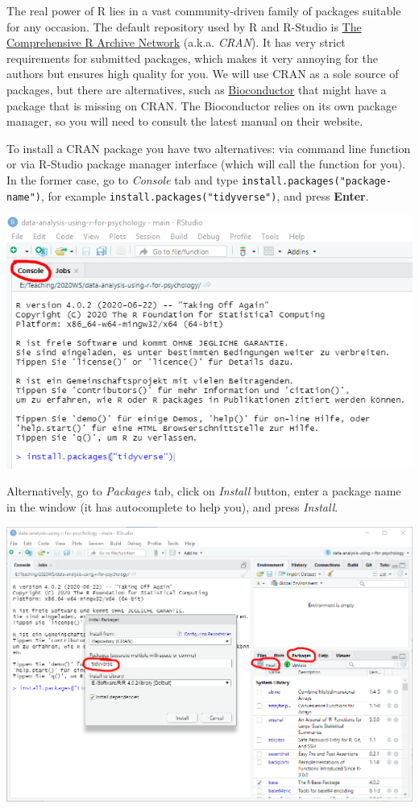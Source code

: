 \documentclass[
]{book}
\begin{document}
The real power of R lies in a vast community-driven family of packages suitable for any occasion. The default repository used by R and R-Studio is \href{https://cran.r-project.org/}{The Comprehensive R Archive Network} (a.k.a. \emph{CRAN}). It has very strict requirements for submitted packages, which makes it very annoying for the authors but ensures high quality for you. We will use CRAN as a sole source of packages, but there are alternatives, such as \href{http://www.bioconductor.org/}{Bioconductor} that might have a package that is missing on CRAN. The Bioconductor relies on its own package manager, so you will need to consult the latest manual on their website.

To install a CRAN package you have two alternatives: via command line function or via R-Studio package manager interface (which will call the function for you). In the former case, go to \emph{Console} tab and type \texttt{install.packages("package-name")}, for example \texttt{install.packages("tidyverse")}, and press \textbf{Enter}.

\begin{center}\includegraphics[width=1\linewidth]{images/install-packages-cmd} \end{center}

Alternatively, go to \emph{Packages} tab, click on \emph{Install} button, enter a package name in the window (it has autocomplete to help you), and press \emph{Install}.

\begin{center}\includegraphics[width=1\linewidth]{images/install-packages-gui} \end{center}
\end{document}
